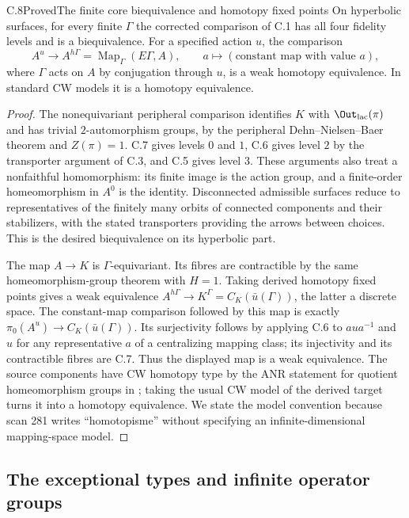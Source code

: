 \begin{claim}{C.8}{Proved}{The finite core biequivalence and homotopy fixed points}
On hyperbolic surfaces, for every finite $\Gamma$ the corrected
comparison of C.1 has all four fidelity levels and is a biequivalence.
For a specified action $u$, the comparison
\[
 A^u\longrightarrow A^{h\Gamma}
      =\operatorname{Map}_\Gamma(E\Gamma,A),
 \qquad a\longmapsto(\text{constant map with value }a),
\]
where $\Gamma$ acts on $A$ by conjugation through $u$, is a weak homotopy
equivalence. In standard CW models it is a homotopy equivalence.
\end{claim}
\begin{proof}
The nonequivariant peripheral comparison identifies $K$ with
$\Out_{\rm lac}(\pi)$ and has trivial $2$-automorphism groups, by the
peripheral Dehn--Nielsen--Baer theorem
\cite[Theorems 8.1 and 8.8]{C_FarbMargalit2012} and $Z(\pi)=1$.
C.7 gives levels $0$ and $1$, C.6 gives level $2$ by the transporter
argument of C.3, and C.5 gives level $3$. These arguments also treat a
nonfaithful homomorphism: its finite image is the action group, and a
finite-order homeomorphism in $A^0$ is the identity. Disconnected
admissible surfaces reduce to representatives of the finitely many
orbits of connected components and their stabilizers, with the stated
transporters providing the arrows between choices. This is the desired
biequivalence on its hyperbolic part.

The map $A\to K$ is $\Gamma$-equivariant. Its fibres are contractible by
the same homeomorphism-group theorem with $H=1$. Taking derived
homotopy fixed points gives a weak equivalence
$A^{h\Gamma}\to K^\Gamma=C_K(\bar u(\Gamma))$, the latter a discrete
space. The constant-map comparison followed by this map is exactly
$\pi_0(A^u)\to C_K(\bar u(\Gamma))$. Its surjectivity follows by applying
C.6 to $a u a^{-1}$ and $u$ for any representative $a$ of a centralizing
mapping class; its injectivity and its contractible fibres are C.7.
Thus the displayed map is a weak equivalence. The source components
have CW homotopy type by the ANR statement for quotient homeomorphism
groups in \cite{C_Yagasaki2000}; taking the usual CW model of the
derived target turns it into a homotopy equivalence. We state the model
convention because scan 281 writes ``homotopisme'' without specifying
an infinite-dimensional mapping-space model.
\end{proof}

\subsection{The exceptional types and infinite operator groups}


